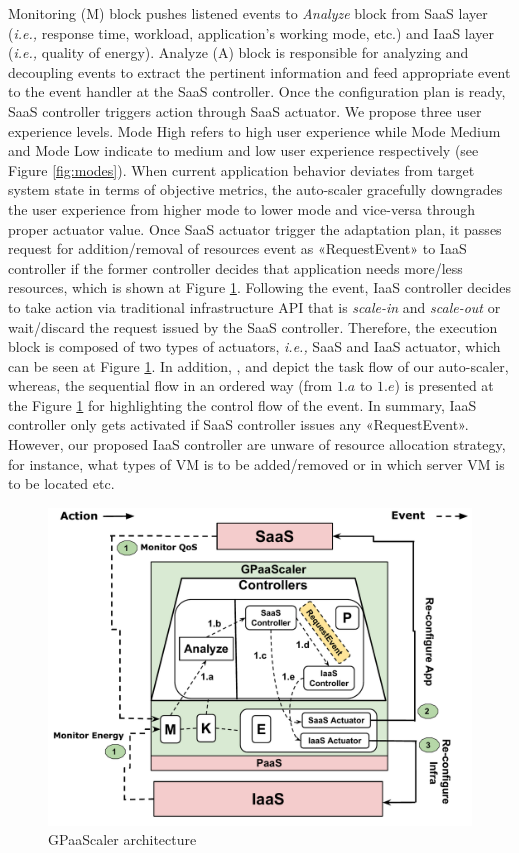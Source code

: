 Monitoring (M) block pushes listened events to \emph{Analyze} block from SaaS layer (\emph{i.e.,} response time, workload, application's working mode, etc.) and IaaS layer (\emph{i.e.,} quality of energy). Analyze (A) block is responsible for analyzing and decoupling events to extract the pertinent information and feed appropriate event to the event handler at the SaaS controller. Once the configuration plan is ready, SaaS controller triggers action through SaaS actuator.
We propose three user experience levels. Mode High refers to high user
experience while Mode Medium and Mode Low indicate to medium and low user experience respectively (see Figure \ref{fig:modes}). When current application behavior deviates from target system state in terms of objective metrics, the auto-scaler gracefully downgrades the user experience from higher mode to lower mode and vice-versa through proper actuator value. Once SaaS actuator trigger the adaptation plan, it passes request for addition/removal of resources event as «RequestEvent» to IaaS controller if the former controller decides that application needs more/less resources, which is shown at Figure \ref{fig:GPaaScaler}. Following the event, IaaS controller decides to take action via traditional infrastructure API that is \emph{scale-in} and \emph{scale-out} or wait/discard the request issued by the SaaS controller. Therefore, the execution block is composed of two types of actuators, \emph{i.e.,} SaaS and IaaS actuator, which can be seen at Figure \ref{fig:GPaaScaler}. In addition, ,  and  depict the task flow of our auto-scaler, 
whereas, the sequential flow in an ordered way (from $1.a$ to $1.e$) is presented at the Figure \ref{fig:GPaaScaler} for highlighting the control flow of the event.
In summary, IaaS controller only gets activated if SaaS controller issues any «RequestEvent». However, our proposed IaaS controller are unware of resource allocation strategy, for instance, what types of VM is to be added/removed or in which server VM is to be located etc.  




\begin{figure} [ht]
\centering
\includegraphics[scale=.38]{Graphs/test_gpaascaler.pdf}
\caption{GPaaScaler architecture}
\label{fig:GPaaScaler}
\end{figure}


